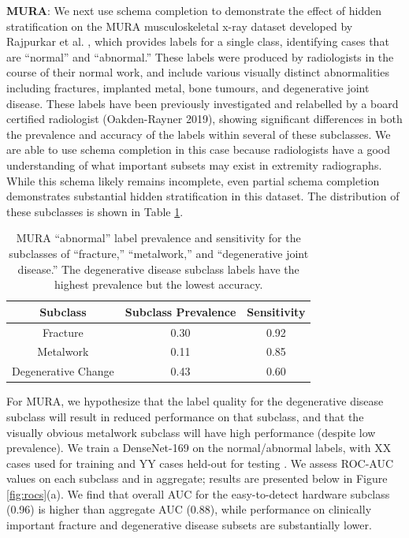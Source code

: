 \documentclass{article}
\begin{document}
\textbf{MURA}: We next use schema completion to demonstrate the effect of hidden stratification on the MURA musculoskeletal x-ray dataset developed by Rajpurkar et al. \citep{Rajpurkar2017-rc}, which provides labels for a single class, identifying cases that are ``normal'' and ``abnormal.'' 
These labels were produced by radiologists in the course of their normal work, and include various visually distinct abnormalities including fractures, implanted metal, bone tumours, and degenerative joint disease. 
These labels have been previously investigated and relabelled by a board certified radiologist (Oakden-Rayner 2019), showing significant differences in both the prevalence and accuracy of the labels within several of these subclasses. 
We are able to use schema completion in this case because radiologists have a good understanding of what important subsets may exist in extremity radiographs.
While this schema likely remains incomplete, even partial schema completion demonstrates substantial hidden stratification in this dataset.
The distribution of these subclasses is shown in Table \ref{tab:mura2}.

\begin{table}[]
\centering
\begin{tabular}{|c|c|c|}
 \hline
 Subclass & Subclass Prevalence & Sensitivity \\
 \hline
 Fracture & 0.30 & 0.92   \\
 Metalwork & 0.11 & 0.85    \\
 Degenerative Change & 0.43 & 0.60 \\
 \hline
\end{tabular}
\caption{MURA ``abnormal'' label prevalence and sensitivity for the subclasses of ``fracture,'' ``metalwork,'' and ``degenerative joint disease.'' The degenerative disease subclass labels have the highest prevalence but the lowest accuracy.}
\label{tab:mura2}
\vspace{-6mm}
\end{table}

For MURA, we hypothesize that the label quality for the degenerative disease subclass will result in reduced performance on that subclass, and that the visually obvious metalwork subclass will have high performance (despite low prevalence).
 We train a DenseNet-169 on the normal/abnormal labels, with XX cases used for training and YY cases held-out for testing \citep{Rajpurkar2017-rc}.  
 We assess ROC-AUC values on each subclass and in aggregate; results are presented below in Figure \ref{fig:rocs}(a).  
 We find that overall AUC for the easy-to-detect hardware subclass (0.96) is higher than aggregate AUC (0.88), while performance on clinically important fracture and degenerative  disease subsets are substantially lower.  
\end{document}
